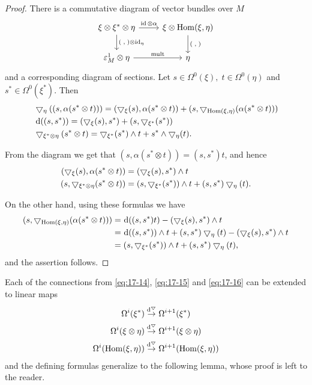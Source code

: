 \begin{proof}
  There is a commutative diagram of vector bundles over $M$
  \[\begin{tikzcd}
    \xi\otimes\xi^*\otimes\eta\dar{(\;,\;)\otimes\id_\eta}\rar{\id\otimes\alpha} & \xi\otimes\hom(\xi, \eta)\dar{(\;,\;)}\\
    \varepsilon_M^1\otimes\eta\rar{\text{mult}} & \eta
  \end{tikzcd}\]
  and a corresponding diagram of sections. Let $s \in  \Omega^0(\xi),\;t \in  \Omega^0( \eta )$ 
  and $s^* \in  \Omega^0( \xi^*)$. Then
  \begin{align*}
    & \btd_{\eta }(( {s,\alpha ( {s^* \otimes  t}) }) ) 
      = ( {\btd_{\xi }(s),\alpha ( {s^* \otimes  t}) })  
      + ( {s,\btd_{\hom( \xi, \eta) }( {\alpha ( {s^* \otimes  t}) }) }) \\
    & \dd( ( {s,s^*}) )  = ( {\btd_{\xi }(s),s^*}) 
      + ( {s,\btd_{\xi^*}( s^*) }) \\
    & \btd_{\xi^* \otimes  \eta }( {s^* \otimes  t}) 
      = \btd_{\xi^*}( s^*)  \land  t 
      + s^* \land  \btd_{\eta }(t).
  \end{align*}

  From the diagram we get that $( {s,\alpha ( {s^* \otimes  t}) })  = ( {s,s^*}) t$, and hence
  \begin{align*}
    ( {\bigtriangledown_{\xi }(s),\alpha ( {s^* \otimes  t}) }) 
      & = ( {\bigtriangledown_{\xi }(s),s^*})  \land  t \\  
    ( {s,\bigtriangledown_{\xi^* \otimes  \eta }( {s^* \otimes  t}) })  
      & = ( {s,\bigtriangledown_{\xi^*}( s^*) })  \land  t + ( {s,s^*}) \bigtriangledown_{\eta }(t).
  \end{align*}

  On the other hand, using these formulas we have
  \begin{align*}
    ( {s,\btd_{\hom( \xi, \eta) }( {\alpha ( {s^* \otimes  t}) }) })  
    & = \!\dd( {( {s,s^*}) t}) - ( {\btd_{\xi }(s),s^*})  \land  t \\
    & = \!\dd( ( {s,s^*}) )  \land  t + ( {s,s^*}) \btd_{\eta }(t) - ( {\btd_{\xi }(s),s^*})  \land  t \\
    & = ( {s,\btd_{\xi^*}( s^*) })  \land  t + ( {s,s^*}) \btd_{\eta }(t),
  \end{align*}
  and the assertion follows.
\end{proof}

Each of the connections from \eqref{eq:17-14}, \eqref{eq:17-15} and \eqref{eq:17-16} can 
be extended to linear maps
\begin{align*}
  \Omega^{i}( \xi^*) & \overset{\dd^\btd}{ \ra  }\Omega^{i + 1}( \xi^*)\\
  \Omega^{i}( {\xi  \otimes  \eta }) & \overset{\dd^\btd}{ \ra  }\Omega^{i + 1}( {\xi  \otimes  \eta })\\
  \Omega^{i}(\hom(\xi,\eta)) & \overset{\dd^\btd}{ \ra  }\Omega^{i + 1}( {\hom( \xi, \eta) })
\end{align*}
and the defining formulas generalize to the following lemma, whose proof is left to the reader.

